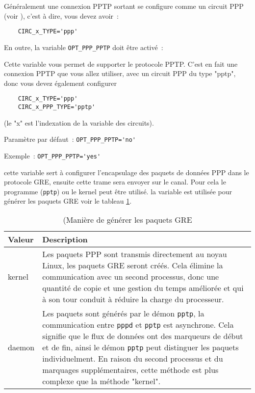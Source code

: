 Généralement une connexion PPTP sortant se configure comme un circuit PPP
(voir ), c'est à dire, vous devez
avoir~:

\begin{example}
\begin{verbatim}
    CIRC_x_TYPE='ppp'
\end{verbatim}
\end{example}

En outre, la variable \verb+OPT_PPP_PPTP+ doit être activé~:

\begin{description}

Cette variable vous permet de supporter le protocole PPTP. C'est en fait une connexion
PPTP que vous allez utiliser, avec un circuit PPP du type "pptp", donc vous devez
également configurer

\begin{example}
\begin{verbatim}
    CIRC_x_TYPE='ppp'
    CIRC_x_PPP_TYPE='pptp'
\end{verbatim}
\end{example}

(le "x" est l'indexation de la variable des circuits).

Paramètre par défaut~: \verb+OPT_PPP_PPTP='no'+

Exemple~: \verb+OPT_PPP_PPTP='yes'+


cette variable sert à configurer l'encapsulage des paquets de données PPP dans
le protocole GRE, ensuite cette trame sera envoyer sur le canal. Pour cela le programme
(\texttt{pptp}) ou le kernel peut être utilisé. la variable 
est utilisée pour générer les paquets GRE voir le tableau \ref{tab:pptp-type}.

\begin{table}[h!]
  \centering
  \begin{tabular}{|l|p{10cm}|}
    \hline
    Valeur & Description \\
    \hline
    kernel & Les paquets PPP sont transmis directement au noyau Linux,
    les paquets GRE seront créés. Cela élimine la communication avec
    un second processus, donc une quantité de copie et une gestion du temps
    améliorée et qui à son tour conduit à réduire la charge du processeur.\\
    daemon & Les paquets sont générés par le démon \texttt{pptp}, la communication
    entre \texttt{pppd} et \texttt{pptp} est asynchrone. Cela signifie que
    le flux de données ont des marqueurs de début et de fin, ainsi le démon
    \texttt{pptp} peut distinguer les paquets individuelment. En raison du
    second processus et du marquages supplémentaires, cette méthode est
    plus complexe que la méthode "kernel".\\
    \hline
  \end{tabular}
  \caption{(Manière de générer les paquets GRE}
  \label{tab:pptp-type}
\end{table}


\end{description}
